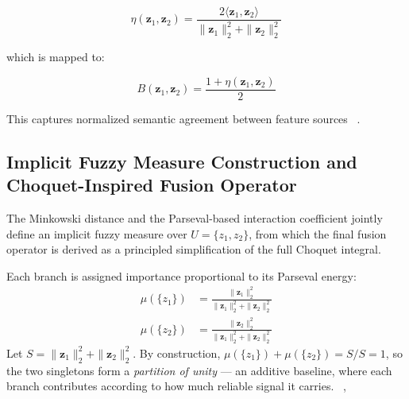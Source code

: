 \documentclass[12pt]{article}
\begin{document}
\begin{equation*}
\eta(\mathbf{z}_1, \mathbf{z}_2)
=
\frac{2\langle \mathbf{z}_1, \mathbf{z}_2 \rangle}
{\|\mathbf{z}_1\|_2^2 + \|\mathbf{z}_2\|_2^2}
\end{equation*}

which is mapped to:

\begin{equation*}
B(\mathbf{z}_1, \mathbf{z}_2)
=
\frac{1 + \eta(\mathbf{z}_1, \mathbf{z}_2)}{2}
\end{equation*}

This captures normalized semantic agreement between feature sources ~\cite{b9,b10}.

\subsection{Implicit Fuzzy Measure Construction and Choquet-Inspired Fusion Operator}

The Minkowski distance and the Parseval-based interaction coefficient jointly define an implicit fuzzy measure over $U = \{z_1, z_2\}$, from which the final fusion operator is derived as a principled simplification of the full Choquet integral.

Each branch is assigned importance proportional to its Parseval energy:
\begin{align*}
    \mu(\{z_1\}) &= \frac{\|\mathbf{z}_1\|_2^2}{\|\mathbf{z}_1\|_2^2 + \|\mathbf{z}_2\|_2^2} \\[6pt]
    \mu(\{z_2\}) &= \frac{\|\mathbf{z}_2\|_2^2}{\|\mathbf{z}_1\|_2^2 + \|\mathbf{z}_2\|_2^2}
\end{align*}
Let $S = \|\mathbf{z}_1\|_2^2 + \|\mathbf{z}_2\|_2^2$. By construction, $\mu(\{z_1\}) + \mu(\{z_2\}) = S/S = 1$, so the two singletons form a \emph{partition of unity} — an additive baseline, where each branch contributes according to how much reliable signal it carries. ~\cite{b15},~\cite{b14}
\end{document}
